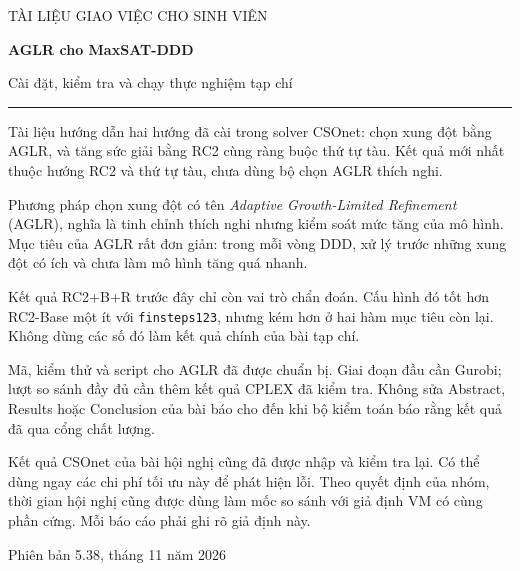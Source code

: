 \documentclass[11pt,a4paper]{article}
\newcommand{\code}[1]{\texttt{#1}}
\begin{document}
\begin{center}
\end{center}
\hypersetup{pageanchor=false}
\begin{titlepage}
\vspace*{20mm}
{\large TÀI LIỆU GIAO VIỆC CHO SINH VIÊN\par}
\vspace{12mm}
{\LARGE\bfseries AGLR cho MaxSAT-DDD\par}
\vspace{4mm}
{\Large Cài đặt, kiểm tra và chạy thực nghiệm tạp chí\par}
\vspace{12mm}
\rule{\textwidth}{0.4pt}
\vspace{6mm}

Tài liệu hướng dẫn hai hướng đã cài trong solver CSOnet: chọn xung đột bằng
AGLR, và tăng sức giải bằng RC2 cùng ràng buộc thứ tự tàu. Kết quả mới nhất
thuộc hướng RC2 và thứ tự tàu, chưa dùng bộ chọn AGLR thích nghi.

Phương pháp chọn xung đột
có tên \emph{Adaptive Growth-Limited Refinement} (AGLR), nghĩa là tinh chỉnh
thích nghi nhưng kiểm soát mức tăng của mô hình. Mục tiêu của AGLR rất đơn giản:
trong mỗi vòng DDD, xử lý trước những xung đột có ích và chưa làm mô hình tăng
quá nhanh.

Kết quả RC2+B+R trước đây chỉ còn vai trò chẩn đoán. Cấu hình đó tốt hơn
RC2-Base một ít với \code{finsteps123}, nhưng kém hơn ở hai hàm mục tiêu còn lại.
Không dùng các số đó làm kết quả chính của bài tạp chí.

Mã, kiểm thử và script cho AGLR đã được chuẩn bị. Giai đoạn đầu cần Gurobi;
lượt so sánh đầy đủ cần thêm kết quả CPLEX đã kiểm tra. Không sửa Abstract,
Results hoặc Conclusion của bài báo
cho đến khi bộ kiểm toán báo rằng kết quả đã qua cổng chất lượng.

Kết quả CSOnet của bài hội nghị cũng đã được nhập và kiểm tra lại. Có thể dùng
ngay các chi phí tối ưu này để phát hiện lỗi. Theo quyết định của nhóm, thời
gian hội nghị cũng được dùng làm mốc so sánh với giả định VM có cùng phần cứng.
Mỗi báo cáo phải ghi rõ giả định này.

\vfill
{\normalsize Phiên bản 5.38, tháng 11 năm 2026\par}
\end{titlepage}
\end{document}
